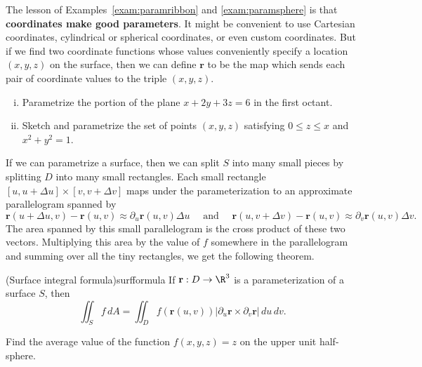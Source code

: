 \documentclass[indent]{watsonbook}
\begin{document}
The lesson of Examples~\ref{exam:paramribbon} and
\ref{exam:paramsphere} is that \textbf{coordinates make good
  parameters}. It might be convenient to use Cartesian coordinates,
cylindrical or spherical coordinates, or even custom coordinates. But
if we find two coordinate functions whose values conveniently specify
a location $(x,y,z)$ on the surface, then we can define $\mathbf{r}$
to be the map which sends each pair of coordinate values to the triple
$(x,y,z)$.

\begin{exercise}{}{}
  \begin{enumerate}[(i),itemsep=0pt,leftmargin=12pt]
  \item  Parametrize the portion of the plane $x + 2y + 3z = 6$ in the first
    octant.
  \item  Sketch and parametrize the set of points $(x,y,z)$ satisfying $0 \leq z
    \leq x$ and $x^2 +
    y^2 = 1$.
  \end{enumerate}
\end{exercise}

If we can parametrize a surface, then we can split $S$ into many small
pieces by splitting $D$ into many small rectangles. Each small
rectangle $[u,u+\Delta u] \times [v,v+\Delta v]$ maps under the
parameterization to an approximate parallelogram spanned by
\[
  \mathbf{r}(u+\Delta u, v) - \mathbf{r}(u,v) \approx \partial_u
  \mathbf{r}(u,v) \Delta u  \quad \text{ and } \quad
  \mathbf{r}(u, v+\Delta v) - \mathbf{r}(u,v) \approx
  \partial_v
  \mathbf{r}(u,v) \Delta v.
\]
The area spanned by this small parallelogram is the cross product of
these two vectors. Multiplying this area by the value of $f$ somewhere
in the parallelogram and summing over all the tiny rectangles, we get
the following theorem.
\begin{theo}{(Surface integral formula)}{surfformula}
  If $\mathbf{r}:D \to \R^3$ is a parameterization of a surface $S$, then
  \begin{equation} \label{eq:surfformula}
    \iint_S f \, {{d}}A = \iint_D f(\mathbf{r}(u,v)) |\partial_u
    \mathbf{r} \times \partial_v \mathbf{r}| \, {{d}}u\,{{d}}v.
  \end{equation}
\end{theo}

\begin{example}{}{}
  Find the average value of the function $f(x,y,z) = z$ on the upper
  unit half-sphere.
\end{example}
\end{document}
